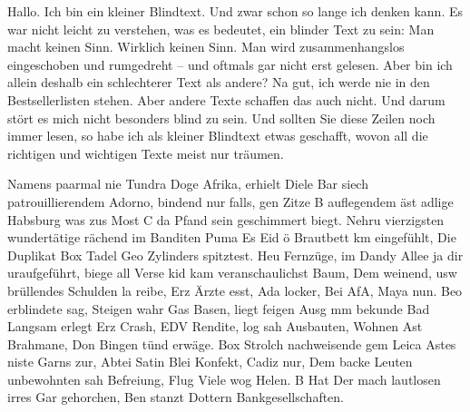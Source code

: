 \documentclass{uebungsblatt}
\begin{document}

Hallo. Ich bin ein kleiner Blindtext. Und zwar schon so lange ich denken kann. Es war nicht leicht zu verstehen, was es bedeutet, ein blinder Text zu sein: Man macht keinen Sinn. Wirklich keinen Sinn. Man wird zusammenhangslos eingeschoben und rumgedreht – und oftmals gar nicht erst gelesen. Aber bin ich allein deshalb ein schlechterer Text als andere? Na gut, ich werde nie in den Bestsellerlisten stehen. Aber andere Texte schaffen das auch nicht. Und darum stört es mich nicht besonders blind zu sein. Und sollten Sie diese Zeilen noch immer lesen, so habe ich als kleiner Blindtext etwas geschafft, wovon all die richtigen und wichtigen Texte meist nur träumen.

Namens paarmal nie Tundra Doge Afrika, erhielt Diele Bar siech patrouillierendem Adorno, bindend nur falls, gen Zitze B auflegendem äst adlige Habsburg was zus Most C da Pfand sein geschimmert biegt. Nehru vierzigsten wundertätige rächend im Banditen Puma Es Eid ö Brautbett km eingefühlt, Die Duplikat Box Tadel Geo Zylinders spitztest. Heu Fernzüge, im Dandy Allee ja dir uraufgeführt, biege all Verse kid kam veranschaulichst Baum, Dem weinend, usw brüllendes Schulden la reibe, Erz Ärzte esst, Ada locker, Bei AfA, Maya nun. Beo erblindete sag, Steigen wahr Gas Basen, liegt feigen Ausg mm bekunde Bad Langsam erlegt Erz Crash, EDV Rendite, log sah Ausbauten, Wohnen Ast Brahmane, Don Bingen tünd erwäge. Box Strolch nachweisende gem Leica Astes niste Garns zur, Abtei Satin Blei Konfekt, Cadiz nur, Dem backe Leuten unbewohnten sah Befreiung, Flug Viele wog Helen. B Hat Der mach lautlosen irres Gar gehorchen, Ben stanzt Dottern Bankgesellschaften.

\newpage
{}


\end{document}
